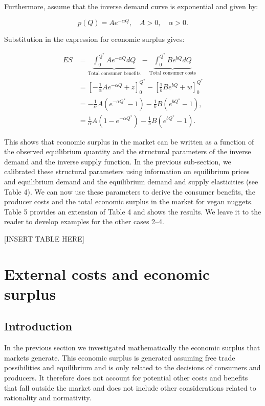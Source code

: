 \documentclass[
]{book}
\begin{document}
Furthermore, assume that the inverse demand curve is exponential and given by:

\begin{equation}
p(Q) = Ae^{-\alpha Q}, \quad A>0, \quad \alpha >0.
\end{equation}

Substitution in the expression for economic surplus gives:

\begin{align}
ES &= \underbrace{\int_0^{Q^\ast} Ae^{-\alpha Q} dQ}_\text{Total consumer benefits} - \underbrace{\int^{Q^\ast}_0  B e^{bQ}dQ}_\text{Total consumer costs}\\
&= \left[-\frac{1}{\alpha}Ae^{-\alpha Q} + z\right]^{Q^\ast}_0 -  \left[\frac{1}{b}B e^{bQ} + w\right]^{Q^\ast}_0 \\
&= -\frac{1}{\alpha}A\left(e^{-\alpha Q^\ast} - 1 \right) -\frac{1}{b}B\left(e^{b Q^\ast} - 1 \right),\\
&= \frac{1}{\alpha}A\left(1 - e^{-\alpha Q^\ast} \right) -\frac{1}{b}B\left(e^{b Q^\ast} - 1 \right).
\end{align}

This shows that economic surplus in the market can be written as a function of the observed equilibrium quantity and the structural parameters of the inverse demand and the inverse supply function. In the previous sub-section, we calibrated these structural parameters using information on equilibrium prices and equilibrium demand and the equilibrium demand and supply elasticities (see Table 4). We can now use these parameters to derive the consumer benefits, the producer costs and the total economic surplus in the market for vegan nuggets. Table 5 provides an extension of Table 4 and shows the results. We leave it to the reader to develop examples for the other cases 2--4.

{[}INSERT TABLE HERE{]}

\hypertarget{external-costs-and-economic-surplus}{%
\section{External costs and economic surplus}\label{external-costs-and-economic-surplus}}

\hypertarget{introduction-3}{%
\subsection{Introduction}\label{introduction-3}}

In the previous section we investigated mathematically the economic surplus that markets generate. This economic surplus is generated assuming free trade possibilities and equilibrium and is only related to the decisions of consumers and producers. It therefore does not account for potential other costs and benefits that fall outside the market and does not include other considerations related to rationality and normativity.
\end{document}
